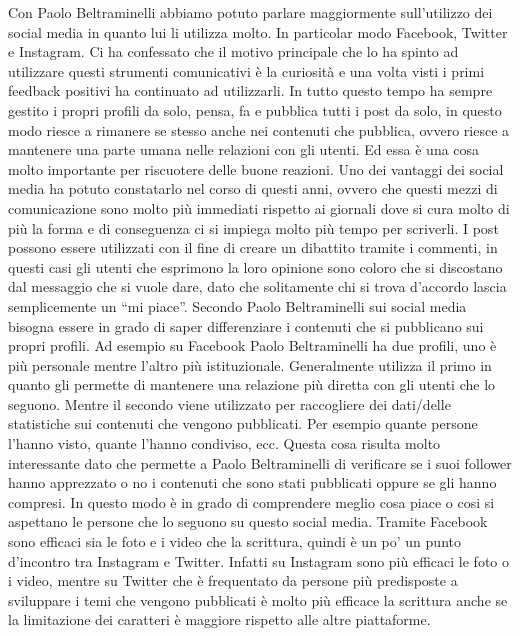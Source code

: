 Con Paolo Beltraminelli abbiamo potuto parlare maggiormente sull’utilizzo dei social media in quanto lui li utilizza molto. In particolar modo Facebook, Twitter e Instagram. Ci ha confessato che il motivo principale che lo ha spinto ad utilizzare questi strumenti comunicativi è la curiosità e una volta visti i primi feedback positivi ha continuato ad utilizzarli. In tutto questo tempo ha sempre gestito i propri profili da solo, pensa, fa e pubblica tutti i post da solo, in questo modo riesce a rimanere se stesso anche nei contenuti che pubblica, ovvero riesce a mantenere una parte umana nelle relazioni con gli utenti. Ed essa è una cosa molto importante per riscuotere delle buone reazioni. Uno dei vantaggi dei social media ha potuto constatarlo nel corso di questi anni, ovvero che questi mezzi di comunicazione sono molto più immediati rispetto ai giornali dove si cura molto di più la forma e di conseguenza ci si impiega molto più tempo per scriverli. I post possono essere utilizzati con il fine di creare un dibattito tramite i commenti, in questi casi gli utenti che esprimono la loro opinione sono coloro che si discostano dal messaggio che si vuole dare, dato che solitamente chi si trova d’accordo lascia semplicemente un “mi piace”. Secondo Paolo Beltraminelli sui social media bisogna essere in grado di saper differenziare i contenuti che si pubblicano sui propri profili. Ad esempio su Facebook Paolo Beltraminelli ha due profili, uno è più personale mentre l’altro più istituzionale. Generalmente utilizza il primo in quanto gli permette di mantenere una relazione più diretta con gli utenti che lo seguono. Mentre il secondo viene utilizzato per raccogliere dei dati/delle statistiche sui contenuti che vengono pubblicati. Per esempio quante persone l’hanno visto, quante l’hanno condiviso, ecc. Questa cosa risulta molto interessante dato che permette a Paolo Beltraminelli di verificare se i suoi follower hanno apprezzato o no i contenuti che sono stati pubblicati oppure se gli hanno compresi. In questo modo è in grado di comprendere meglio cosa piace o cosi si aspettano le persone che lo seguono su questo social media. Tramite Facebook sono efficaci sia le foto e i video che la scrittura, quindi è un po' un punto d’incontro tra Instagram e Twitter. Infatti su Instagram sono più efficaci le foto o i video, mentre su Twitter che è frequentato da persone più predisposte a sviluppare i temi che vengono pubblicati è molto più efficace la scrittura anche se la limitazione dei caratteri è maggiore rispetto alle altre piattaforme. 
